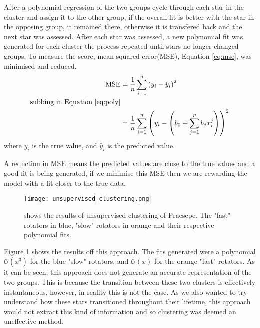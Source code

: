 \documentclass[fleqn,usenatbib]{mnras}
\begin{document}
After a polynomial regression of the two groups cycle through each star in the cluster and assign it to the other group, if the overall fit is better with the star in the opposing group, it remained there, otherwise it is transfered back and the next star was assessed.
After each star was assessed, a new polynomial fit was generated for each cluster the process repeated until stars no longer changed groups.
To measure the score, mean squared error(MSE), Equation \ref{eq:mse}, was minimised and reduced.
\begin{align}
	\label{eq:mse}
	\textup{MSE} &= \frac{1}{n}\sum_{i=1}^n \left(y_i - \hat{y}_i\right)^2 \\
	\textup{subbing in Equation \ref{eq:poly}} \nonumber \\
	&= \frac{1}{n}\sum_{i = 1}^n \left(y_i - \left(b_0 + \sum_{j = 1}^p b_jx_i^j\right) \right)^2
\end{align}
where $y_i$ is the true value, and $\hat{y}_i$ is the predicted value.
	
A reduction in MSE means the predicted values are close to the true values and a good fit is being generated, if we minimise this MSE then we are rewarding the model with a fit closer to the true data.

\begin{figure}
	\texttt{[image: unsupervised\_clustering.png]}
	\caption{shows the results of unsupervised clustering of Praesepe. The "fast" rotators in blue, "slow" rotators in orange and their respective polynomial fits.}
	\label{fig:unsupervised_clustering}
\end{figure}

Figure \ref{fig:unsupervised_clustering} shows the results off this approach.
The fits generated were a polynomial $\mathcal{O}(x^3)$ for the blue "slow" rotators, and $\mathcal{O}(x)$ for the orange "fast" rotators.
As it can be seen, this approach does not generate an accurate representation of the two groups.
This is because the transition between these two clusters is effectively instantaneous, however, in reality this is not the case.
As we also wanted to try understand how these stars transitioned throughout their lifetime, this approach would not extract this kind of information and so clustering was deemed an uneffective method.
\end{document}
